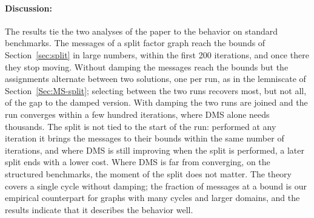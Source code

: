 \paragraph{Discussion:}
\label{Sec:disc}
The results tie the two analyses of the paper to the behavior on standard benchmarks. The messages of a split factor graph reach the bounds of Section~\ref{sec:split} in large numbers, within the first 200 iterations, and once there they stop moving. Without damping the messages reach the bounds but the assignments alternate between two solutions, one per run, as in the lemniscate of Section~\ref{Sec:MS-split}; selecting between the two runs recovers most, but not all, of the gap to the damped version. With damping the two runs are joined and the run converges within a few hundred iterations, where DMS alone needs thousands. The split is not tied to the start of the run: performed at any iteration it brings the messages to their bounds within the same number of iterations, and where DMS is still improving when the split is performed, a later split ends with a lower cost. Where DMS is far from converging, on the structured benchmarks, the moment of the split does not matter. The theory covers a single cycle without damping; the fraction of messages at a bound is our empirical counterpart for graphs with many cycles and larger domains, and the results indicate that it describes the behavior well.

%
